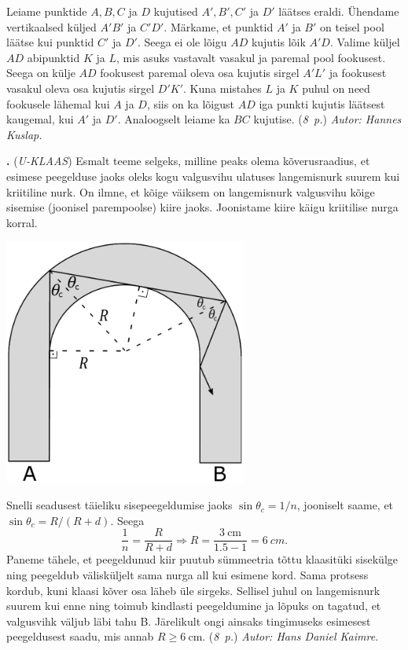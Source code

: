 \documentclass[12pt,a5paper]{article}
\newcommand{\numb}[1]{\vspace{5pt}\textbf{\large #1}}
\newcommand{\nimi}[1]{(\textsl{\small #1})}
\newcommand{\punktid}[1]{(\emph{#1~p.})}
\newcommand{\autor}[1]{\emph{ Autor: #1.}}
\newcounter{ylesanne}
\newcommand{\yl}[1]{\addtocounter{ylesanne}{1}\numb{\theylesanne.} \nimi{#1} \newblock{}}
\begin{document}
Leiame punktide $A, B, C$ ja $D$ kujutised $A', B', C'$ ja $D'$ läätses eraldi. Ühendame vertikaalsed küljed $A'B'$ ja $C'D'$. Märkame, et punktid $A'$ ja $B'$ on teisel pool läätse kui punktid $C'$ ja $D'$. Seega ei ole lõigu $AD$ kujutis lõik $A'D$. Valime küljel $AD$ abipunktid $K$ ja $L$, mis asuks vastavalt vasakul ja paremal pool fookusest. Seega on külje $AD$ fookusest paremal oleva osa kujutis sirgel $A'L'$ ja fookusest vasakul oleva osa kujutis sirgel $D'K'$. Kuna mistahes $L$ ja $K$ puhul on need fookusele lähemal kui $A$ ja $D$, siis on ka lõigust $AD$ iga punkti kujutis läätsest kaugemal, kui $A'$ ja $D'$.
Analoogselt leiame ka $BC$ kujutise.
\punktid{8} \autor{Hannes Kuslap}


\yl{U-KLAAS}
Esmalt teeme selgeks, milline peaks olema kõverusraadius, et esimese peegelduse jaoks oleks kogu valgusvihu ulatuses langemisnurk suurem kui kriitiline nurk. On ilmne, et kõige väiksem on langemisnurk valgusvihu kõige sisemise (joonisel parempoolse) kiire jaoks. Joonistame kiire käigu kriitilise nurga korral.

\begin{center}
	\includegraphics[width=0.6\textwidth]{uklaas_lah.pdf} 
\end{center}

Snelli seadusest täieliku sisepeegeldumise jaoks
$\sin\theta_c = {1}/{n}$, jooniselt saame, et $\sin\theta_c=R/(R+d)$. Seega
$$\frac{1}{n}=\frac{R}{R+d}\Rightarrow R = \frac{\SI{3}{\cm}}{1.5-1}=\SI{6}{cm}.$$
Paneme tähele, et peegeldunud kiir puutub sümmeetria tõttu klaasitüki sisekülge ning peegeldub välisküljelt sama nurga all kui esimene kord. Sama protsess kordub, kuni klaasi kõver osa läheb üle sirgeks. Sellisel juhul on langemisnurk suurem kui enne ning toimub kindlasti peegeldumine ja lõpuks on tagatud, et valgusvihk väljub läbi tahu B. Järelikult ongi ainsaks tingimuseks esimesest peegeldusest saadu, mis annab $R\geq\SI{6}{\cm}$.
\punktid{8} \autor{Hans Daniel Kaimre}
\end{document}

